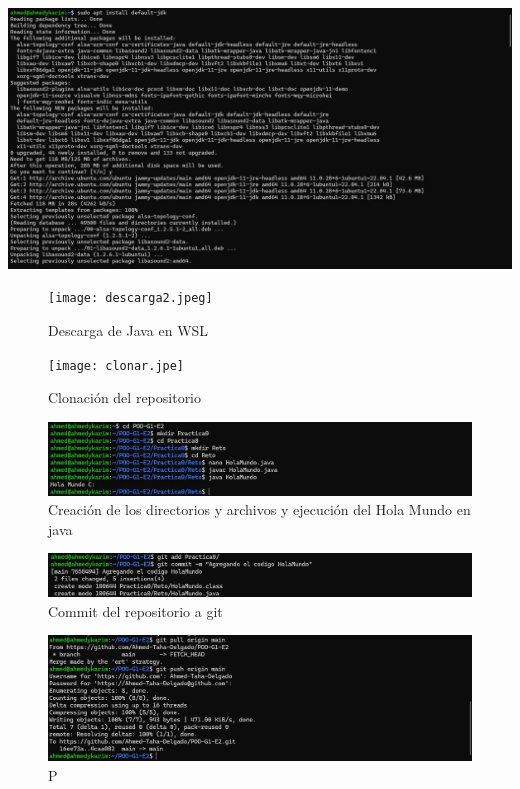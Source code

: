 \documentclass[letterpaper,12pt]{article}
\begin{document}
\begin{center}
    \includegraphics[width=14cm]{descarga1.jpeg}
\end{center}

\begin{figure}[H]
    \centering
    \texttt{[image: descarga2.jpeg]}
    \caption{Descarga de Java en WSL}
    \label{fig:java}
\end{figure}

\begin{figure}[H]
    \centering
    \texttt{[image: clonar.jpe]}
    \caption{Clonación del repositorio}
    \label{fig:java}
\end{figure}

\begin{figure}[H]
    \centering
    \includegraphics[width=14cm]{creacion.jpeg}
    \caption{Creación de los directorios y archivos y ejecución del Hola Mundo en java}
    \label{fig:java}
\end{figure}

\begin{figure}[H]
    \centering
    \includegraphics[width=14cm]{commit.jpeg}
    \caption{Commit del repositorio a git}
    \label{fig:java}
\end{figure}

\begin{figure}[H]
    \centering
    \includegraphics[width=14cm]{push.jpeg}
    \caption{P}
    \label{fig:java}
\end{figure}
\end{document}

